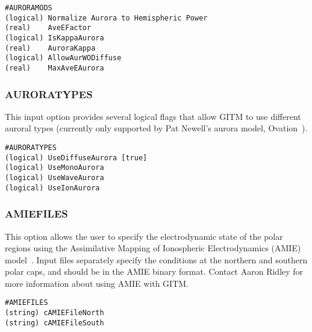 \begin{verbatim}
#AURORAMODS
(logical) Normalize Aurora to Hemispheric Power
(real)    AveEFactor
(logical) IsKappaAurora
(real)    AuroraKappa
(logical) AllowAurWODiffuse
(real)    MaxAveEAurora
\end{verbatim}

\subsubsection{AURORATYPES}
\label{newellauroratypes.sec}

This input option provides several logical flags that allow GITM to use different auroral types (currently only supported by Pat Newell's aurora model, Ovation~\citep{Newell:2002ov}).

\begin{verbatim}
#AURORATYPES
(logical) UseDiffuseAurora [true]
(logical) UseMonoAurora
(logical) UseWaveAurora
(logical) UseIonAurora 
\end{verbatim}




\subsubsection{AMIEFILES}
\label{amiefiles.sec}

This option allows the user to specify the electrodynamic state of the polar regions using the Assimilative Mapping of Ionospheric Electrodynamics (AMIE) model~\citep{ridley:2004aa}.  Input files separately specify the conditions at the northern and southern polar caps, and should be in the AMIE binary format.  Contact Aaron Ridley for more information about using AMIE with GITM.

\begin{verbatim}
#AMIEFILES
(string) cAMIEFileNorth 
(string) cAMIEFileSouth
\end{verbatim}

